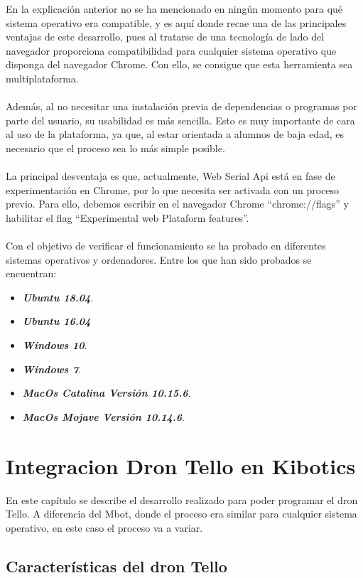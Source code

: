 \documentclass{report}
\begin{document}
En la explicación anterior no se ha mencionado en ningún momento para qué sistema operativo era compatible, y es aquí donde recae una de las principales ventajas de este desarrollo, pues al tratarse de una tecnología de lado del navegador proporciona compatibilidad para cualquier sistema operativo que disponga del navegador Chrome. Con ello, se consigue que esta herramienta sea multiplataforma.
\\
\\
Además, al no necesitar una instalación previa de dependencias o programas por parte del usuario, su usabilidad es más sencilla. Esto es muy importante de cara al uso de la plataforma, ya que, al estar orientada a alumnos de baja edad, es necesario que el proceso sea lo más simple posible.
\\
\\
La principal desventaja es que, actualmente, Web Serial Api está en fase de experimentación en Chrome, por lo que necesita ser activada con un proceso previo. Para ello, debemos escribir en el navegador Chrome “chrome://flags” y habilitar el flag “Experimental web Plataform features”.
\\ 
\\
Con el objetivo de verificar el funcionamiento se ha probado en diferentes sistemas operativos y ordenadores. Entre los que han sido probados se encuentran:
\begin{itemize}
	\item \textit{\textbf{Ubuntu 18.04}}.
	\item \textit{\textbf{Ubuntu 16.04}}
	\item \textit{\textbf{Windows 10}}.
	\item \textit{\textbf{Windows 7}}.
	\item \textit{\textbf{MacOs Catalina Versión 10.15.6}}.
	\item \textit{\textbf{MacOs Mojave Versión 10.14.6}}.
\end{itemize}

\chapter{Integracion Dron Tello en Kibotics}

En este capítulo se describe el desarrollo realizado para poder programar el dron Tello. A diferencia del Mbot, donde el proceso era similar para cualquier sistema operativo, en este caso el proceso va a variar.

\section{Características del dron Tello}
\end{document}
